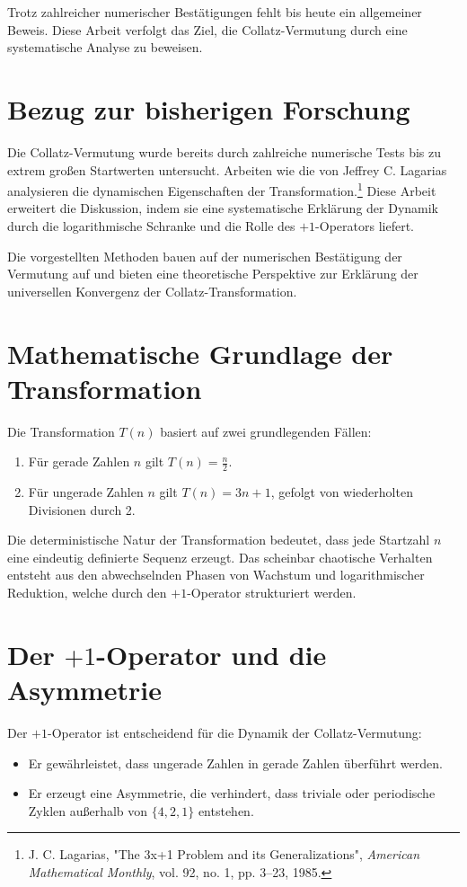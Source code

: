 \documentclass[a4paper,12pt]{article}
\begin{document}
Trotz zahlreicher numerischer Bestätigungen fehlt bis heute ein allgemeiner Beweis. Diese Arbeit verfolgt das Ziel, die Collatz-Vermutung durch eine systematische Analyse zu beweisen.

\section{Bezug zur bisherigen Forschung}
Die Collatz-Vermutung wurde bereits durch zahlreiche numerische Tests bis zu extrem großen Startwerten untersucht. Arbeiten wie die von Jeffrey C. Lagarias analysieren die dynamischen Eigenschaften der Transformation.\footnote{J. C. Lagarias, "The 3x+1 Problem and its Generalizations", \textit{American Mathematical Monthly}, vol. 92, no. 1, pp. 3–23, 1985.} Diese Arbeit erweitert die Diskussion, indem sie eine systematische Erklärung der Dynamik durch die logarithmische Schranke und die Rolle des \(+1\)-Operators liefert.

Die vorgestellten Methoden bauen auf der numerischen Bestätigung der Vermutung auf und bieten eine theoretische Perspektive zur Erklärung der universellen Konvergenz der Collatz-Transformation.

\section{Mathematische Grundlage der Transformation}
Die Transformation \( T(n) \) basiert auf zwei grundlegenden Fällen:
\begin{enumerate}
    \item Für gerade Zahlen \( n \) gilt \( T(n) = \frac{n}{2} \).
    \item Für ungerade Zahlen \( n \) gilt \( T(n) = 3n + 1 \), gefolgt von wiederholten Divisionen durch 2.
\end{enumerate}

Die deterministische Natur der Transformation bedeutet, dass jede Startzahl \( n \) eine eindeutig definierte Sequenz erzeugt. Das scheinbar chaotische Verhalten entsteht aus den abwechselnden Phasen von Wachstum und logarithmischer Reduktion, welche durch den \(+1\)-Operator strukturiert werden.

\section{Der \(+1\)-Operator und die Asymmetrie}
Der \(+1\)-Operator ist entscheidend für die Dynamik der Collatz-Vermutung:
\begin{itemize}
    \item Er gewährleistet, dass ungerade Zahlen in gerade Zahlen überführt werden.
    \item Er erzeugt eine Asymmetrie, die verhindert, dass triviale oder periodische Zyklen außerhalb von \( \{4, 2, 1\} \) entstehen.
\end{itemize}
\end{document}
